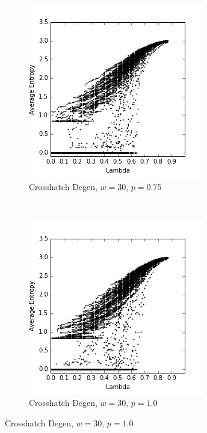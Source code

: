 \documentclass[a4paper,11pt]{report}
\begin{document}
\begin{figure}[htp]
\begin{subfigure}[t]{0.4\textwidth}
  \end{subfigure}

\begin{subfigure}[t]{0.4\textwidth}
  \centering
  \includegraphics[width=\textwidth]{ch6_figs/ch_w30_p75_entropy_scatter}
  \caption{Crosshatch Degen, $w=30$, $p=0.75$}

  \end{subfigure}
~
\begin{subfigure}[t]{0.4\textwidth}
  \centering
  \includegraphics[width=\textwidth]{ch6_figs/ch_w30_p100_entropy_scatter}
  \caption{Crosshatch Degen, $w=30$, $p=1.0$}
  \label{fig:lw_w30_p100}
  \end{subfigure}


\end{figure}
\end{document}
